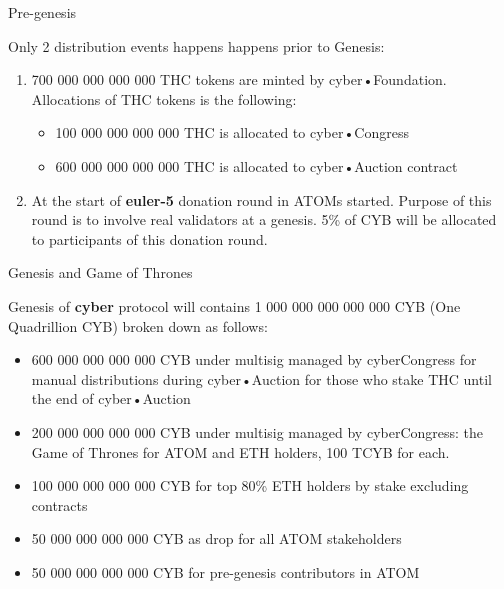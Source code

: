 \documentclass[10pt,oneside]{amsart}
\makeatletter
\def\section{\@startsection{section}{1}%
  \z@{.7\linespacing\@plus\linespacing}{.5\linespacing}%
  {\normalfont\scshape}}%
\newcommand{\code}[1]{\textbf{#1}}
\makeatother
\begin{document}
\section{Pre-genesis}\label{Pre-genesis}

Only 2 distribution events happens happens prior to Genesis:

\begin{enumerate}
  \item 700 000 000 000 000 THC tokens are minted by cyber•Foundation. Allocations of THC tokens is the following:

\begin{itemize}
\item 100 000 000 000 000 THC is allocated to cyber•Congress
\item 600 000 000 000 000 THC is allocated to cyber•Auction contract
\end{itemize}

 \item At the start of \code{euler-5} donation round in ATOMs started. Purpose of this round is to involve real validators at a genesis. 5\% of CYB will be allocated to participants of this donation round.

\end{enumerate}

\section{Genesis and Game of Thrones}\label{Genesis and Game of Thrones}

Genesis of \code{cyber} protocol will contains 1 000 000 000 000 000 CYB (One Quadrillion CYB) broken down as follows:

\begin{itemize}
\item 600 000 000 000 000 CYB under multisig managed by cyberCongress for manual distributions during cyber•Auction for those who stake THC until the end of cyber•Auction
\item 200 000 000 000 000 CYB under multisig managed by cyberCongress: the Game of Thrones for ATOM and ETH holders, 100 TCYB for each.
\item 100 000 000 000 000 CYB for top 80\% ETH holders by stake excluding contracts
\item  50 000 000 000 000 CYB as drop for all ATOM stakeholders
\item  50 000 000 000 000 CYB for pre-genesis contributors in ATOM
\end{itemize}
\end{document}
